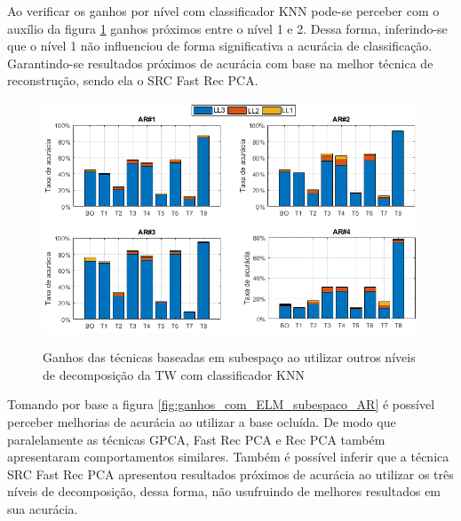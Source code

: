 Ao verificar os ganhos por nível com classificador KNN pode-se perceber com o auxílio da figura \ref{fig:ganhos_com_KNN_subespaco_AR} ganhos próximos entre o nível 1 e 2. Dessa forma, inferindo-se que o nível 1 não influenciou de forma significativa a acurácia de classificação. Garantindo-se resultados próximos de acurácia com base na melhor técnica de reconstrução, sendo ela o SRC Fast Rec PCA.

\begin{figure}[H]
\centering
\caption{Ganhos das técnicas baseadas em subespaço ao utilizar outros níveis de decomposição da TW com classificador KNN}
\includegraphics[scale=0.60]{imgs4/ganhos/ganhos_subespaco_KNN_niveis}
\label{fig:ganhos_com_KNN_subespaco_AR}
\end{figure}



Tomando por base a figura \ref{fig:ganhos_com_ELM_subespaco_AR} é possível perceber melhorias de acurácia ao utilizar a base ocluída. De modo que paralelamente as técnicas GPCA, Fast Rec PCA e Rec PCA também apresentaram comportamentos similares. Também é possível inferir que a técnica SRC Fast Rec PCA apresentou resultados próximos de acurácia ao utilizar os três níveis de decomposição, dessa forma, não usufruindo de melhores resultados em sua acurácia.


